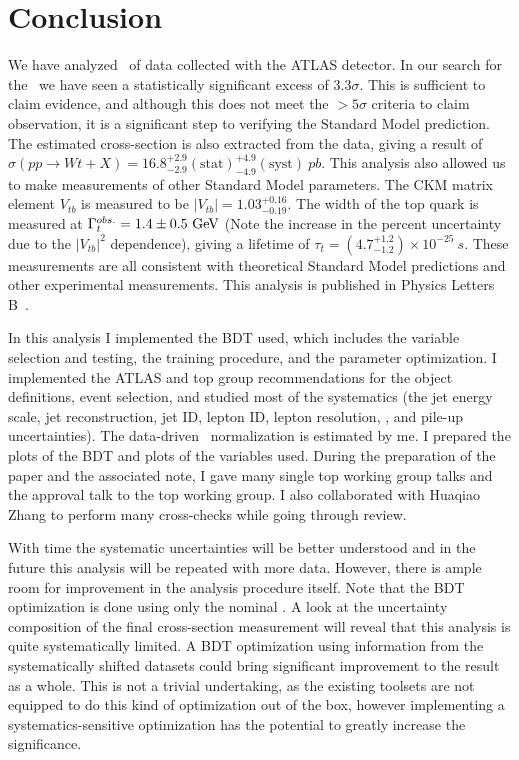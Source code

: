\chapter{Conclusion}
We have analyzed \LUMI\ of data collected with the ATLAS detector. In our search for the \Wtchan\ we have seen a statistically significant excess of 3.3$\sigma$. This is sufficient to claim evidence, and although this does not meet the $>5\sigma$ criteria to claim observation, it is a significant step to verifying the Standard Model prediction. The estimated cross-section is also extracted from the data, giving a result of $\sigma(pp\rightarrow Wt + X) = 16.8 ^{+2.9}_{-2.9} \mathrm{(stat)} ^{+4.9}_{-4.9} \mathrm{(syst)}~pb$. This analysis also allowed us to make measurements of other Standard Model parameters. The CKM matrix element $V_{tb}$ is measured to be $|V_{tb}| = 1.03^{+0.16}_{-0.19}$. The width of the top quark is measured at $\Gamma_{t}^{obs.} = 1.4\pm 0.5~\rm GeV$ (Note the increase in the percent uncertainty due to the $|V_{tb}|^2$ dependence), giving a lifetime of $\tau_{t}=(4.7^{+1.2}_{-1.2})\times 10^{-25}~s$. These measurements are all consistent with theoretical Standard Model predictions and other experimental measurements. This analysis is published in Physics Letters B~\cite{WTEVIDENCE}.

In this analysis I implemented the BDT used, which includes the variable selection and testing, the training procedure, and the parameter optimization. I implemented the ATLAS and top group recommendations for the object definitions, event selection, and studied most of the systematics (the jet energy scale, jet reconstruction, jet ID, lepton ID, lepton resolution, \MET, and pile-up uncertainties). The data-driven \Ztt\ normalization is estimated by me. I prepared the plots of the BDT and plots of the variables used. During the preparation of the paper and the associated note, I gave many single top working group talks and the approval talk to the top working group. I also collaborated with Huaqiao Zhang to perform many cross-checks while going through review.

With time the systematic uncertainties will be better understood and in the future this analysis will be repeated with more data. However, there is ample room for improvement in the analysis procedure itself. Note that the BDT optimization is done using only the nominal \MC. A look at the uncertainty composition of the final cross-section measurement will reveal that this analysis is quite systematically limited. A BDT optimization using information from the systematically shifted datasets could bring significant improvement to the result as a whole. This is not a trivial undertaking, as the existing toolsets are not equipped to do this kind of optimization out of the box, however implementing a systematics-sensitive optimization has the potential to greatly increase the significance.

